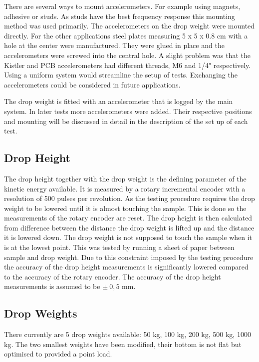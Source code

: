 There are several ways to mount accelerometers. For example using magnets, adhesive or studs. As studs have the best frequency response this mounting method was used primarily. \autocite[24]{Hanly16} The accelerometers on the drop weight were mounted directly. For the other applications steel plates measuring 5 x 5 x 0.8 cm with a hole at the center were manufactured. They were glued in place and the accelerometers were screwed into the central hole.  A slight problem was that the Kistler and PCB accelerometers had different threads, M6 and 1/4" respectively. Using a uniform system would streamline the setup of tests. Exchanging the accelerometers could be considered in future applications.

The drop weight is fitted with an accelerometer that is logged by the main system. In later tests more accelerometers were added. Their respective positions and mounting will be discussed in detail in the description of the set up of each test.

\subsection{Drop Height}

The drop height together with the drop weight is the defining parameter of the kinetic energy available. It is measured by a rotary incremental encoder with a resolution of 500 pulses per revolution. As the testing procedure requires the drop weight to be lowered until it is almost touching the sample. This is done so the measurements of the rotary encoder are reset. The drop height is then calculated from difference between the distance the drop weight is lifted up and the distance it is lowered down. The drop weight is not supposed to touch the sample when it is at the lowest point. This was tested by running a sheet of paper between sample and drop weight.
Due to this constraint imposed by the testing procedure the accuracy of the drop height measurements is significantly lowered compared to the accuracy of the rotary encoder. The accuracy of the drop height measurements is assumed to be $\pm~0,5$ mm. 

\subsection{Drop Weights}

There currently are 5 drop weights available: 50 kg, 100 kg, 200 kg, 500 kg, 1000 kg. The two smallest weights have been modified, their bottom is not flat but optimised to provided a point load.

